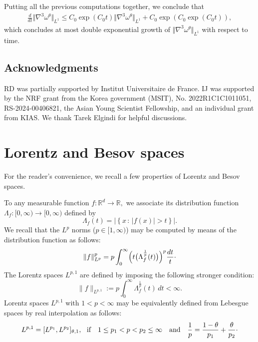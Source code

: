 \documentclass[11pt]{amsart}
\newcommand{\R}{{\mathbb R}}
\numberwithin{equation}{section}
\newcommand{\nrm}[1]{\Vert#1\Vert}
\newcommand{\nb}{\nabla}
\newcommand{\andf}{\quad\hbox{and}\quad}
\begin{document}
Putting all the previous computations together, we conclude that \begin{equation*}
	\begin{split}
		\frac{d}{dt} \nrm{ \nb^{3} \omega^\theta }_{L^{1}} \le C_0 \exp(C_0t) \nrm{ \nb^{3}\omega^\theta }_{L^{1}}  + C_0 \exp( C_0 \exp (C_0t)), 
	\end{split}
\end{equation*} which concludes at most double exponential growth of $ \nrm{ \nb^{3} \omega^\theta }_{L^{1}} $ with respect to time. 	
	

 

\subsection*{Acknowledgments}
RD was partially supported by Institut Universitaire de France. IJ was supported by the NRF grant from the Korea government (MSIT), No. 2022R1C1C1011051, RS-2024-00406821, the Asian Young Scientist Fellowship, and an individual grant from KIAS. We thank Tarek Elgindi for helpful discussions. 
 



\appendix 

\section{Lorentz and Besov spaces}

For the reader's convenience, we recall a few properties of Lorentz and Besov spaces. 

 
 To any measurable function $f:\R^d\to\R,$ we associate its distribution function  $\Lambda_f:[0,\infty)\to[0,\infty)$ defined by
 $$\Lambda_{f}(t) = \left| \left\{ x \, : \, |f(x)| > t \right\} \right|.$$
 We recall that the $L^p$ norms ($p\in[1,\infty)$) may be computed by means of the distribution function as follows:
 $$ \|f\|_{L^p}^p= p\int_0^\infty \Bigl(t\bigl(\Lambda^{\frac1p}_f(t)\bigr)\Bigr)^p\frac{dt}t\cdotp$$ 
 The Lorentz spaces $L^{p,1}$ are defined by imposing the following stronger condition:
 $$ \|f\|_{L^{p,1}}:= p\int_0^\infty \Lambda^{\frac1p}_f(t)\,dt<\infty.$$  
Lorentz spaces $L^{p,1}$ with $1<p<\infty$ may be equivalently defined from Lebesgue spaces by real interpolation 
as follows: 
 \begin{equation}\label{eq:interpo}
 L^{p,1}=[L^{p_1},L^{p_2}]_{\theta,1},\ \ \hbox{if }\ \ 1\leq p_1<p < p_2\leq \infty\andf \frac1p=\frac{1-\theta}{p_1}+\frac\theta{p_2}\cdotp
 \end{equation}
 
\end{document}
